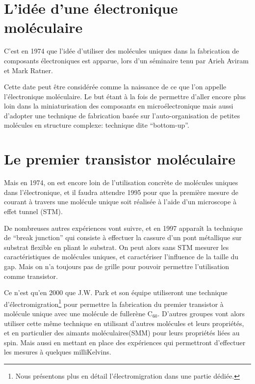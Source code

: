 \section{L'idée d'une électronique moléculaire}
C'est en 1974 que l'idée d'utiliser des molécules uniques dans la fabrication de composants électroniques est apparue, lors d'un séminaire tenu par Arieh Aviram et Mark Ratner.

Cette date peut être considérée comme la naissance de ce que l'on appelle l'électronique moléculaire.
Le but étant à la fois de permettre d'aller encore plus loin dans la miniaturisation des composants en microélectronique mais aussi d'adopter une technique de fabrication basée sur l'auto-organisation de petites molécules en structure complexe: technique dite “bottom-up”.
\section{Le premier transistor moléculaire}
Mais en 1974, on est encore loin de l'utilisation concrète de molécules uniques dans l'électronique, et il faudra attendre 1995 pour que la première mesure de courant à travers une molécule unique soit réalisée à l'aide d'un microscope à effet tunnel (STM).

De nombreuses autres expériences vont suivre, et en 1997 apparaît la technique de “break junction” qui consiste à effectuer la cassure d'un pont métallique sur substrat flexible en pliant le substrat. On peut alors sans STM mesurer les caractéristiques de molécules uniques, et caractériser l'influence de la taille du gap. Mais on n'a toujours pas de grille pour pouvoir permettre l'utilisation comme transistor.

Ce n'est qu'en 2000 que J.W. Park et son équipe utiliseront une technique d'électromigration\footnote{Nous présentons plus en détail l'électromigration dans une partie dédiée.} pour permettre la fabrication du premier transistor à molécule unique avec une molécule de fullerène C$_{60}$. D'autres groupes vont alors utiliser cette même technique en utilisant d'autres molécules et leurs propriétés, et en particulier des aimants moléculaires(SMM) pour leurs propriétés liées au spin. Mais aussi en mettant en place des expériences qui permettront d'effectuer les mesures à quelques milliKelvins.

